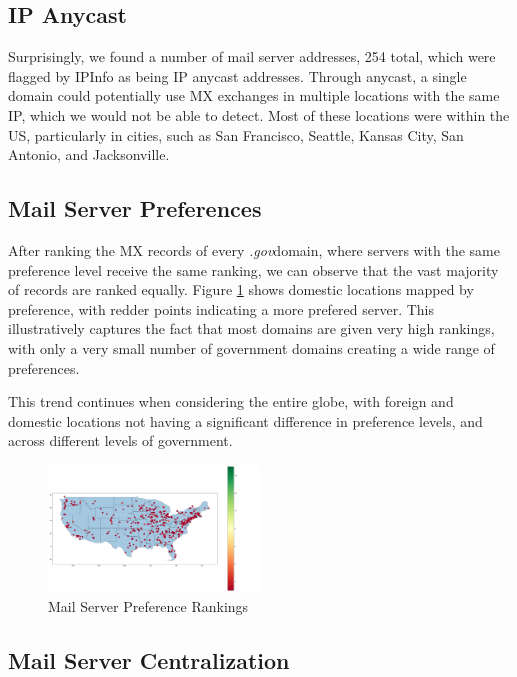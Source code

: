 \documentclass{hotnets21}
\newcommand{\dotgov}{\textit{.gov}\space}
\begin{document}
\subsection{IP Anycast}

Surprisingly, we found a number of mail server addresses, 254 total, which were flagged by IPInfo as being IP anycast addresses.
Through anycast, a single domain could potentially use MX exchanges in multiple locations with the same IP, which we would not be able to detect.
Most of these locations were within the US, particularly in cities, such as San Francisco, Seattle, Kansas City, San Antonio, and Jacksonville.

\subsection{Mail Server Preferences}

After ranking the MX records of every \dotgov domain, where servers with the same preference level receive the same ranking, we can observe that the vast majority of records are ranked equally.
Figure \ref{fig:preferenceus} shows domestic locations mapped by preference, with redder points indicating a more prefered server.
This illustratively captures the fact that most domains are given very high rankings, with only a very small number of government domains creating a wide range of preferences.

This trend continues when considering the entire globe, with foreign and domestic locations not having a significant difference in preference levels, and across different levels of government.

\begin{figure}
\label{fig:preferenceus}
\noindent\includegraphics[width=0.5\textwidth]{Summary/US Preference.png}
\caption{Mail Server Preference Rankings}
\end{figure}

\subsection{Mail Server Centralization}
\end{document}
